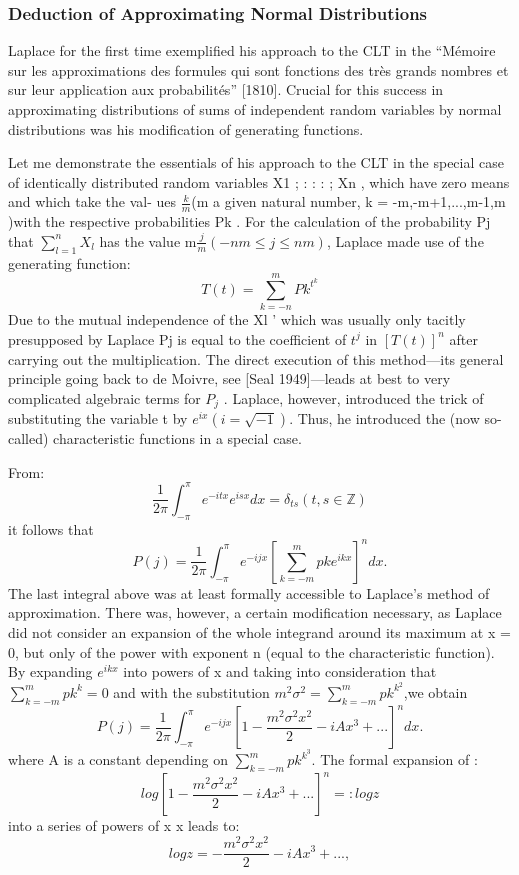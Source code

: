 \documentclass{article}
\begin{document}
\subsubsection{Deduction  of Approximating Normal Distributions}
Laplace for the first time exemplified his approach to the CLT in the “Mémoire
sur les approximations des formules qui sont fonctions des très grands nombres
et sur leur application aux probabilités” [1810]. Crucial for this success in
approximating distributions of sums of independent random variables by normal
distributions was his modification of generating functions.

Let me demonstrate the essentials of his approach to the CLT  in the special case of identically distributed
random variables X1 ; : : : ; Xn , which have zero means and which take the val-
ues $ \frac{k}{m}$(m a given natural number, k = -m,-m+1,...,m-1,m )with the
respective probabilities Pk .
For the calculation of the probability Pj that $ \sum_{l=1}^{n} X_{l} $ 
has the value m$\frac{j}{m}(-nm \leq j \leq nm)$, Laplace made use of the generating function:
\[ T(t) = \sum_{k=-n}^{m} Pk^{t^{k}}  \]
Due to the mutual independence of the Xl ’ which was usually only tacitly presupposed by Laplace Pj is equal to the coefficient
of $ t^{j}  $ in $ [T(t)]^n  $  after carrying out the multiplication.
The direct execution of this method—its general principle going back to de Moivre, see [Seal 1949]—leads at
best to very complicated algebraic terms for $P_j$ .
Laplace, however, introduced the trick of substituting the variable t by $ e^{ix} (i= \sqrt{-1})$. Thus, he introduced the (now so-called) characteristic functions in a special case.

  From: \[ \frac{1}{2\pi} \int _{-\pi}^{\pi}e^{-itx}e^{isx}dx=\delta_{ts} (t,s \in \mathbb{Z}) \]   
  it follows that
  \[ P(j) = \frac{1}{2\pi} \int _{-\pi}^{\pi} e^{-ijx}[\sum_{k=-m}^{m} pke^{ikx}]^n dx. \] 
  The last integral above was at least formally accessible to Laplace’s method of approximation. There was, however, a certain modification necessary, as Laplace did not consider an expansion of the whole integrand around its maximum at
x = 0, but only of the power with exponent n (equal to the characteristic function).
By expanding $e^{ikx}$ into powers of x and taking into consideration that
$  \sum_{k=-m}^{m} pk^{k}= 0 $ and with the substitution $ m^2\sigma^2 = \sum_{k=-m}^{m} pk^{k^2}$,we obtain 
\[ P(j) = \frac{1}{2\pi} \int _{-\pi}^{\pi} e^{-ijx}[1-\frac{m^2\sigma^2x^2}{2} -iAx^3 + ... ]^n dx. \] where A is a constant depending on $ \sum_{k=-m}^{m} pk^{k^3}$.
The formal expansion of :
\[ log[1-\frac{m^2\sigma^2x^2}{2} -iAx^3 + ... ]^n = : log z \]
into a series of powers of x x leads to:
\[ log z= -\frac{m^2\sigma^2x^2}{2} -iAx^3 + ... , \]
\end{document}

